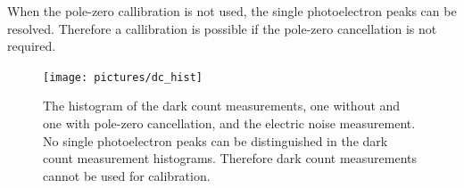 When the pole-zero callibration is not used, the single photoelectron peaks can be resolved.
Therefore a callibration is possible if the pole-zero cancellation is not required.

\begin{figure}
	\centering
	\texttt{[image: pictures/dc\_hist]}
	\caption[Histogram of the dark count measurements]{The histogram of the dark count measurements, one without and one with pole-zero cancellation, and the electric noise measurement. No single photoelectron peaks can be distinguished in the dark count measurement histograms. Therefore dark count measurements cannot be used for calibration.} 
	\label{fig:dc_hist}
\end{figure}










